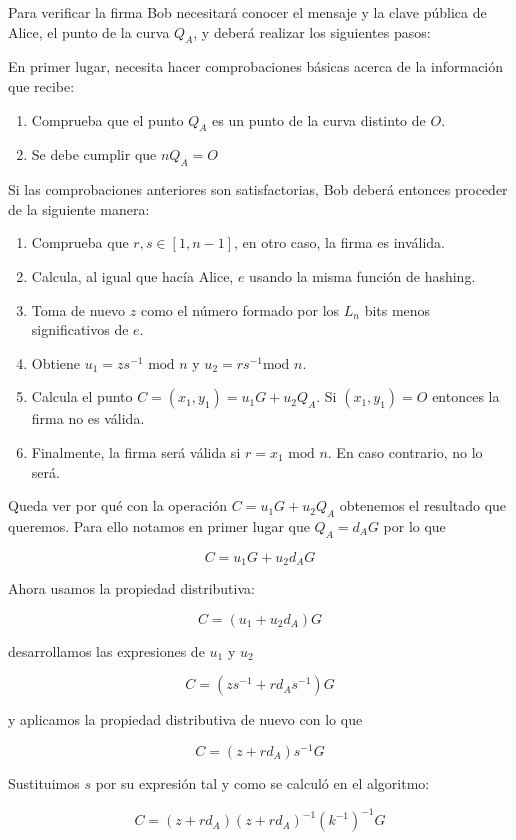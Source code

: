 \documentclass{article}
\begin{document}
Para verificar la firma Bob necesitará conocer el mensaje y la clave
pública de Alice, el punto de la curva $Q_A$, y deberá realizar los
siguientes pasos:

En primer lugar, necesita hacer comprobaciones básicas acerca de la
información que recibe:

\begin{enumerate}
\item Comprueba que el punto $Q_A$ es un punto de la curva distinto
de $O$.
\item Se debe cumplir que $nQ_A=O$
\end{enumerate}

Si las comprobaciones anteriores son satisfactorias, Bob deberá
entonces proceder de la siguiente manera:

\begin{enumerate}
\item Comprueba que $r,s\in[1, n-1]$, en otro caso, la firma es
inválida.
\item Calcula, al igual que hacía Alice, $e$ usando la misma
función de hashing.
\item Toma de nuevo $z$ como el número formado por los $L_n$ bits menos significativos de $e$.
\item Obtiene $u_1 = zs^{-1} \text{ mod } n$ y $u_2 = rs^{-1} \text{
mod } n$.
\item Calcula el punto $C = (x_1,y_1)=u_1G+u_2Q_A$. Si $(x_1,
y_1)=O$ entonces la firma no es válida.
\item Finalmente, la firma será válida si $r= x_1 \text{ mod }
n$. En caso contrario, no lo será.
\end{enumerate}

Queda ver por qué con la operación $C=u_1G+u_2Q_A$ obtenemos el
resultado que queremos. Para ello notamos en primer lugar que
$Q_A=d_AG$ por lo que

\[ C=u_1G+u_2d_AG
\]

Ahora usamos la propiedad distributiva:

\[ C = (u_1+u_2d_A)G
\]

desarrollamos las expresiones de $u_1$ y $u_2$

\[ C = (zs^{-1}+rd_As^{-1})G
\]

y aplicamos la propiedad distributiva de nuevo con lo que

\[ C = (z+rd_A)s^{-1}G
\]

Sustituimos $s$ por su expresión tal y como se calculó en el
algoritmo:

\[ C = (z+rd_A)(z+rd_A)^{-1}(k^{-1})^{-1}G
\]
\end{document}
